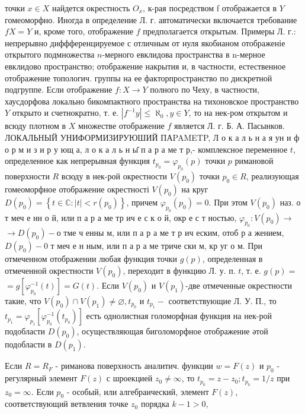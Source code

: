 \documentclass[10pt]{article}
\begin{document}
точки $x \in X$ найдется окрестность $O_{x}$, к-рая посредством f отображается в $Y$ гомеоморфно. Иногда в определение Л. г. автоматически включается требование $f X=Y$ и, кроме того, отображение $f$ предполагается открытым. Примеры Л. г.: непрерывно диффференцируемое с отличным от нуля якобианом отображеніе открытого подмножества $n$-мерного евклидова пространства в n-мерное евклидово пространство; отображение накрытия и, в частности, естественное отображение топологич. группы на ее факторпространство по дискретной подгруппе. Если отображение $f: X \rightarrow Y$ полного по Чеху, в частности, хаусдорфова локально бикомпактного пространства на тихоновское пространство $Y$ открыто и счетнократно, т. е. $\left|f^{-1} y\right| \leqslant \aleph_{0}, y \in Y$, то на нек-ром открытом и всюду плотном в $X$ множестве отображение $f$ является Л. г. Б. А. Пасынков. ЛОКАЛЬНЫЙ УНИФОРМИЗИРУЮШИЙ ПАPAMETP, Л о к а л ь н а я ун и ф о р м и з и р у ющ а, л о к а л ь н ы̆ п а р а ме т р,- комплексное переменное $t$, определенное как непрерывная функция $t_{p_{0}}=\varphi_{p_{0}}(p)$ точки $p$ римановой поверхности $R$ всюду в нек-рой окрестности $V\left(p_{0}\right)$ точки $p_{0} \in R$, реализующая гомеоморфное отображение окрестності $V\left(p_{0}\right)$ на круг $D\left(p_{0}\right)=\left\{t \in \mathbb{C}:|t|<r\left(p_{0}\right)\right\}$, причем $\varphi_{p_{0}}\left(p_{0}\right)=0$. При этом $V\left(p_{0}\right)$ наз. о т меч е нн о й, или п а р а ме тр ич е с к о й, окр е с т ностью, $\varphi_{p_{0}}: V\left(p_{0}\right) \rightarrow$ $\rightarrow D\left(p_{0}\right)-о$ тме ч енны м, или п а р а ме т р ич еским, отоб р а жением, $D\left(p_{0}\right)-0$ т меч е н ным, или п а р а ме триче ски м, кр уг о м. При отмеченном отображении любая функция точки $g(p)$, определенная в отмеченной окрестности $V\left(p_{0}\right)$, переходит в функцию Л. у. п. $t$, т. е. $g(p)=$ $=g\left[\varphi_{p_{0}}^{-1}(t)\right]=G(t)$. Если $V\left(p_{0}\right)$ и $V\left(p_{1}\right)$-две отмеченные окрестности такие, что $V\left(p_{0}\right) \cap V\left(p_{1}\right) \neq \varnothing, t_{p_{0}}$ и $t_{p_{1}}-$ соответствующие Л. У. П., то $t_{p_{1}}=\varphi_{p_{1}}\left[\varphi_{p_{0}}^{-1}\left(t_{p_{0}}\right)\right]$ есть однолистная голоморфная функция на нек-рой подобласти $D\left(p_{0}\right)$, осуществляющая биголоморфное отображение әтой подобласти в $D\left(p_{1}\right)$.



Если $R=R_{F}$ - риманова поверхность аналитич. функции $w=F(z)$ и $p_{0}$ - регулярный элемент $F(z)$ с шроекцией $z_{0} \neq \infty$, то $t_{p_{0}}=z-z_{0} ; t_{p_{0}}=1 / z$ при $z_{0}=\infty$. Если $p_{0}$ - особый, или алгебраический, элемент $F(z)$, соответствующий ветвления точке $z_{0}$ порядка $k-1>0$,
\end{document}
